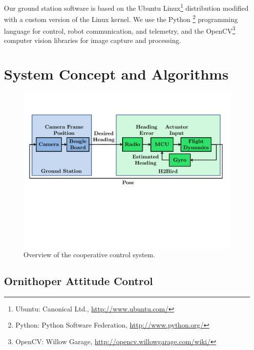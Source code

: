 \documentclass{aamas2013}
\begin{document}
Our ground station software is based on the Ubuntu Linux\footnote{\raggedright Ubuntu: 
Canonical Ltd., \href{http://www.ubuntu.com/}{http://www.ubuntu.com/}} distribution
modified with a custom version of the Linux kernel. We use the Python
\footnote{\raggedright Python: Python Software Federation, \href{http://www.python.org/}
{http://www.python.org/}} programming language for control, robot communication, 
and telemetry, and the OpenCV\footnote{\raggedright OpenCV: Willow Garage, 
\href{http://opencv.willowgarage.com/wiki/}{http://opencv.willowgarage.com/wiki/}} 
computer vision libraries for image capture and processing.
\section{System Concept and Algorithms}

\begin{figure}[tb]
\centering
\includegraphics[width=\linewidth]{figures/process_flow.pdf}
\caption{Overview of the cooperative control system.}
\label{fig:process_flow}
\end{figure}

\subsection{Ornithoper Attitude Control}
\end{document}
